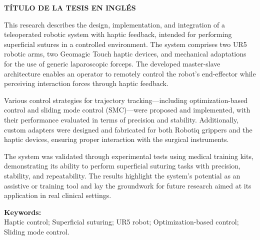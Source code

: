 
\begin{center}
    \large \vspace{-1.5cm} \textbf{TÍTULO DE LA TESIS EN INGLÉS}
\end{center}

This research describes the design, implementation, and integration of a teleoperated robotic system with haptic feedback, intended for performing superficial sutures in a controlled environment.
The system comprises two UR5 robotic arms, two Geomagic Touch haptic devices, and mechanical adaptations for the use of generic laparoscopic forceps.
The developed master-slave architecture enables an operator to remotely control the robot's end-effector while perceiving interaction forces through haptic feedback.

Various control strategies for trajectory tracking—including optimization-based control and sliding mode control (SMC)—were proposed and implemented, with their performance evaluated in terms of precision and stability.
Additionally, custom adapters were designed and fabricated for both Robotiq grippers and the haptic devices, ensuring proper interaction with the surgical instruments.

The system was validated through experimental tests using medical training kits, demonstrating its ability to perform superficial suturing tasks with precision, stability, and repeatability.
The results highlight the system's potential as an assistive or training tool and lay the groundwork for future research aimed at its application in real clinical settings.


\noindent \textbf{Keywords:}\\
\noindent Haptic control; Superficial suturing; UR5 robot; Optimization-based control; Sliding mode control.


